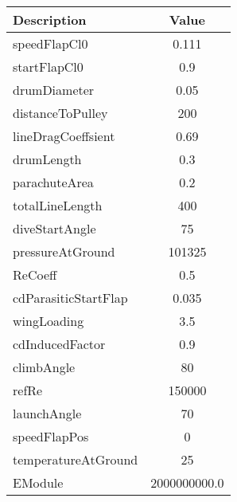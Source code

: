        \begin{center}

            \begin{tabular}{|l|c|}

               \hline

Description & Value  \\ \hline \hline 

speedFlapCl0 & 0.111 \\ \hline 

startFlapCl0 & 0.9 \\ \hline 

drumDiameter & 0.05 \\ \hline 

distanceToPulley & 200 \\ \hline 

lineDragCoeffsient & 0.69 \\ \hline 

drumLength & 0.3 \\ \hline 

parachuteArea & 0.2 \\ \hline 

totalLineLength & 400 \\ \hline 

diveStartAngle & 75 \\ \hline 

pressureAtGround & 101325 \\ \hline 

ReCoeff & 0.5 \\ \hline 

cdParasiticStartFlap & 0.035 \\ \hline 

wingLoading & 3.5 \\ \hline 

cdInducedFactor & 0.9 \\ \hline 

climbAngle & 80 \\ \hline 

refRe & 150000 \\ \hline 

launchAngle & 70 \\ \hline 

speedFlapPos & 0 \\ \hline 

temperatureAtGround & 25 \\ \hline 

EModule & 2000000000.0 \\ \hline 


\end{tabular}
\end{center}
